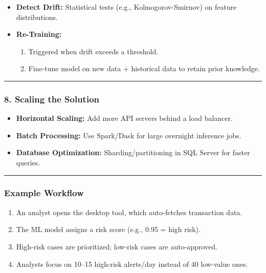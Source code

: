 \documentclass[
]{article}
\providecommand{\tightlist}{%
  \setlength{\itemsep}{0pt}\setlength{\parskip}{0pt}}
\begin{document}
\begin{itemize}
\tightlist
\item
  \textbf{Detect Drift:} Statistical tests (e.g., Kolmogorov-Smirnov) on
  feature distributions.\\
\item
  \textbf{Re-Training:}

  \begin{enumerate}
  \def\labelenumi{\arabic{enumi}.}
  \tightlist
  \item
    Triggered when drift exceeds a threshold.\\
  \item
    Fine-tune model on new data + historical data to retain prior
    knowledge.
  \end{enumerate}
\end{itemize}

\begin{center}\rule{0.5\linewidth}{0.5pt}\end{center}

\subsubsection{\texorpdfstring{\textbf{8. Scaling the
Solution}}{8. Scaling the Solution}}\label{scaling-the-solution}

\begin{itemize}
\tightlist
\item
  \textbf{Horizontal Scaling:} Add more API servers behind a load
  balancer.\\
\item
  \textbf{Batch Processing:} Use Spark/Dask for large overnight
  inference jobs.\\
\item
  \textbf{Database Optimization:} Sharding/partitioning in SQL Server
  for faster queries.
\end{itemize}

\begin{center}\rule{0.5\linewidth}{0.5pt}\end{center}

\subsubsection{\texorpdfstring{\textbf{Example
Workflow}}{Example Workflow}}\label{example-workflow}

\begin{enumerate}
\def\labelenumi{\arabic{enumi}.}
\tightlist
\item
  An analyst opens the desktop tool, which auto-fetches transaction
  data.\\
\item
  The ML model assigns a risk score (e.g., 0.95 = high risk).\\
\item
  High-risk cases are prioritized; low-risk cases are auto-approved.\\
\item
  Analysts focus on 10--15 high-risk alerts/day instead of 40 low-value
  ones.
\end{enumerate}
\end{document}
